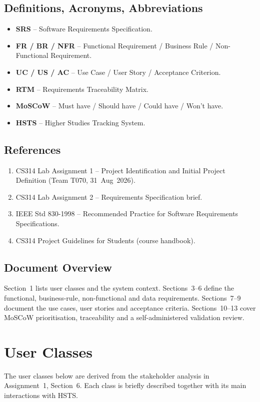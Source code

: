 \documentclass[11pt,a4paper]{article}
\begin{document}
\subsection{Definitions, Acronyms, Abbreviations}
\begin{itemize}
  \item \textbf{SRS} -- Software Requirements Specification.
  \item \textbf{FR / BR / NFR} -- Functional Requirement / Business Rule /
 Non-Functional Requirement.
  \item \textbf{UC / US / AC} -- Use Case / User Story / Acceptance Criterion.
  \item \textbf{RTM} -- Requirements Traceability Matrix.
  \item \textbf{MoSCoW} -- Must have / Should have / Could have / Won't have.
  \item \textbf{HSTS} -- Higher Studies Tracking System.
\end{itemize}

\subsection{References}
\begin{enumerate}
  \item CS314 Lab Assignment 1 -- Project Identification and Initial Project Definition (Team T070, 31~Aug~2026).
  \item CS314 Lab Assignment 2 -- Requirements Specification brief.
  \item IEEE Std 830-1998 -- Recommended Practice for Software Requirements
        Specifications.
  \item CS314 Project Guidelines for Students (course handbook).
\end{enumerate}

\subsection{Document Overview}
Section~1 lists user classes and the system context. Sections~3--6
define the functional, business-rule, non-functional and data
requirements. Sections~7--9 document the use cases, user stories and
acceptance criteria. Sections~10--13 cover MoSCoW prioritisation,
traceability and a self-administered validation review.

\section{User Classes}
The user classes below are derived from the stakeholder analysis in
Assignment~1, Section~6. Each class is briefly described together with
its main interactions with HSTS.
\end{document}
